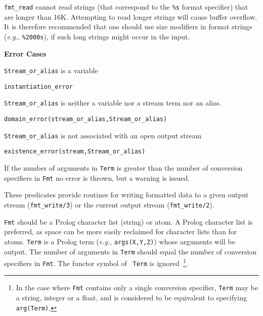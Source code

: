\begin{description}
  {\tt fmt\_read} cannot read strings (that correspond to the {\tt \%s}
  format specifier) that are longer than 16K. Attempting to read longer
  strings will cause buffer overflow. It is therefore recommended that one
  should use size modifiers in format strings ({\it e.g.}, {\tt \%2000s}),
  if such long strings might occur in the input.

{\bf Error Cases}
\bi
\item 	{\tt Stream\_or\_alias} is a variable
\bi
\item {\tt instantiation\_error}
\ei
\item 	{\tt Stream\_or\_alias} is neither a variable nor a stream term nor an alias.
\bi
\item 	{\tt domain\_error(stream\_or\_alias,Stream\_or\_alias)}
\ei
\item 	{\tt Stream\_or\_alias} is not associated with an open output stream
\bi
\item 	{\tt existence\_error(stream,Stream\_or\_alias)}
\ei
\ei

If the number of arguments in {\tt Term} is greater than the number of
conversion specifiers in {\tt Fmt} no error is thrown, but a warning
is issued.

\vspace{-7mm}
%
These predicates provide routines for writing formatted data to a
given output stream ({\tt fmt\_write/3}) or the current output stream
({\tt fmt\_write/2}).

{\tt Fmt} should be a Prolog character list (string) or atom.  A
Prolog character list is preferred, as space can be more easily
reclaimed for character lists than for atoms.  {\tt Term} is a Prolog
term ({\it e.g.}, {\tt args(X,Y,Z)}) whose arguments will be
output. The number of arguments in {\tt Term} should equal the number
of conversion specifiers in {\tt Fmt}.  The functor symbol of {\tt
  Term} is ignored~\footnote{In the case where {\tt Fmt} contains only
  a single conversion specifier, {\tt Term} may be a string, integer
  or a float, and is considered to be equivalent to specifying {\tt
    arg(Term)}.}.
    

\end{description}
